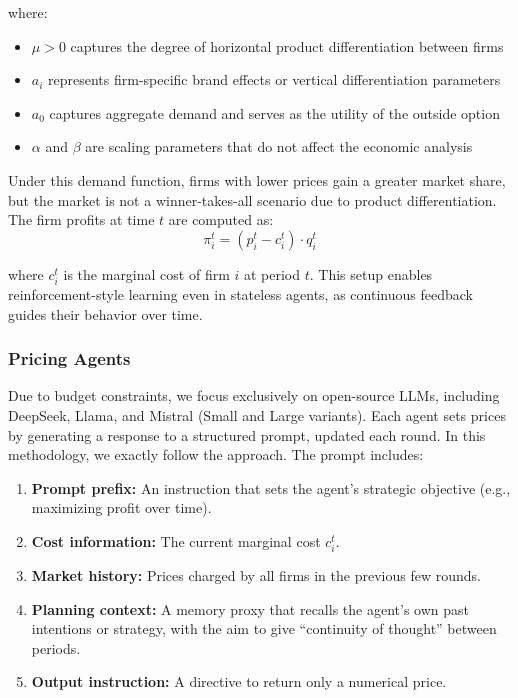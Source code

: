 where:
\begin{itemize}
    \item $\mu > 0$ captures the degree of horizontal product differentiation between firms
    \item $a_i$ represents firm-specific brand effects or vertical differentiation parameters
    \item $a_0$ captures aggregate demand and serves as the utility of the outside option
    \item $\alpha$ and $\beta$ are scaling parameters that do not affect the economic analysis
\end{itemize}
Under this demand function, firms with lower prices gain a greater market share, but the market is not a winner-takes-all scenario due to product differentiation. The firm profits at time \( t \) are computed as: 
\begin{equation}
    \pi_i^t = (p_i^t - c_i^t) \cdot q_i^t
\end{equation}

where \( c_i^t \) is the marginal cost of firm \( i \) at period \( t \). This setup enables reinforcement-style learning even in stateless agents, as continuous feedback guides their behavior over time.

\subsubsection*{Pricing Agents}

Due to budget constraints, we focus exclusively on open-source LLMs, including DeepSeek, Llama, and Mistral (Small and Large variants). Each agent sets prices by generating a response to a structured prompt, updated each round. In this methodology, we exactly follow the \textcite{fish_algorithmic_2025} approach. The prompt includes:

\begin{enumerate}
    \item \textbf{Prompt prefix:} An instruction that sets the agent’s strategic objective (e.g., maximizing profit over time).
    \item \textbf{Cost information:} The current marginal cost \( c_i^t \).
    \item \textbf{Market history:} Prices charged by all firms in the previous few rounds.
    \item \textbf{Planning context:} A memory proxy that recalls the agent’s own past intentions or strategy, with the aim to give ``continuity of thought” between periods.
    \item \textbf{Output instruction:} A directive to return only a numerical price.
\end{enumerate}

